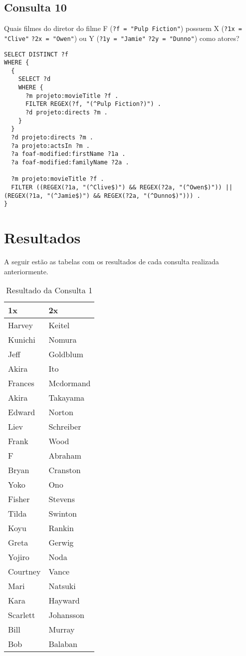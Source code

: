 \documentclass{article}
\newcommand{\code}[1]{\lstinline[mathescape=true]{#1}}
\begin{document}
\subsection{Consulta 10}
Quais filmes do diretor do filme F (\code{?f = "Pulp Fiction"}) possuem X (\code{?1x = "Clive"} \code{?2x = "Owen"}) ou Y (\code{?1y = "Jamie"} \code{?2y = "Dunno"}) como atores?
\begin{lstlisting}[basicstyle=\ttfamily,frame=single]
SELECT DISTINCT ?f
WHERE {
  {
    SELECT ?d
    WHERE {
      ?m projeto:movieTitle ?f .
      FILTER REGEX(?f, "(^Pulp Fiction?)") .
      ?d projeto:directs ?m .
    }
  }
  ?d projeto:directs ?m .
  ?a projeto:actsIn ?m .
  ?a foaf-modified:firstName ?1a .
  ?a foaf-modified:familyName ?2a .

  ?m projeto:movieTitle ?f .
  FILTER ((REGEX(?1a, "(^Clive$)") && REGEX(?2a, "(^Owen$)")) || (REGEX(?1a, "(^Jamie$)") && REGEX(?2a, "(^Dunno$)"))) .
}
\end{lstlisting}
\section{Resultados}

A seguir estão as tabelas com os resultados de cada consulta realizada anteriormente.

\begin{table}[htbp]
\begin{center}
\begin{tabular}{ll}

\textbf{1x} & \textbf{2x} \\ 
\midrule
Harvey & Keitel \\ 
Kunichi & Nomura \\ 
Jeff & Goldblum \\ 
Akira & Ito \\ 
Frances & Mcdormand \\ 
Akira & Takayama \\ 
Edward & Norton \\ 
Liev & Schreiber \\ 
Frank & Wood \\ 
F & Abraham \\ 
Bryan & Cranston \\ 
Yoko & Ono \\ 
Fisher & Stevens \\ 
Tilda & Swinton \\ 
Koyu & Rankin \\ 
Greta & Gerwig \\ 
Yojiro & Noda \\ 
Courtney & Vance \\ 
Mari & Natsuki \\ 
Kara & Hayward \\ 
Scarlett & Johansson \\ 
Bill & Murray \\ 
Bob & Balaban \\ 
\end{tabular}
\end{center}
\caption{Resultado da Consulta 1}
\end{table}
\end{document}
